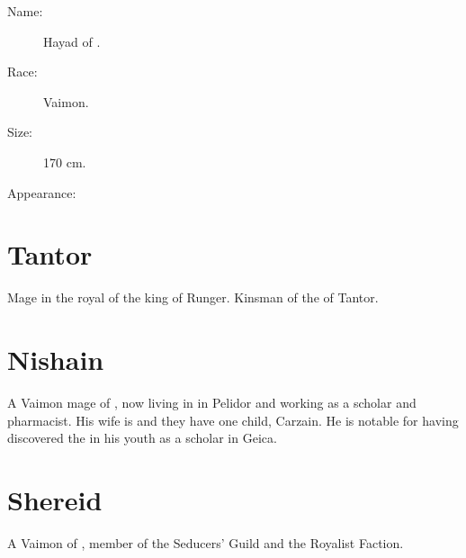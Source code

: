 \begin{description}
  \item[Name:] Hayad \Freid of \ClanGeican. 
  \item[Race:] Vaimon. 
  \item[Size:] 170 cm. 
  \item[Appearance:] 
\end{description}















\section{\Jirad Tantor}
Mage in the royal \ishrah{} of the king of Runger. 
Kinsman of the \scarv{} of Tantor. 
















\section{Nishain \Shireyo}
A Vaimon mage of \ClanGeican, now living in \Redglen{} in Pelidor and working as a scholar and pharmacist. His wife is \Roanne{} \Delishe{} and they have one child, Carzain. He is notable for having discovered the \Kliffah{} \Gavron{} in his youth as a scholar in Geica.

















\section{Shereid}
A Vaimon of \ClanGeican, member of the Seducers' Guild and the Royalist Faction. 

